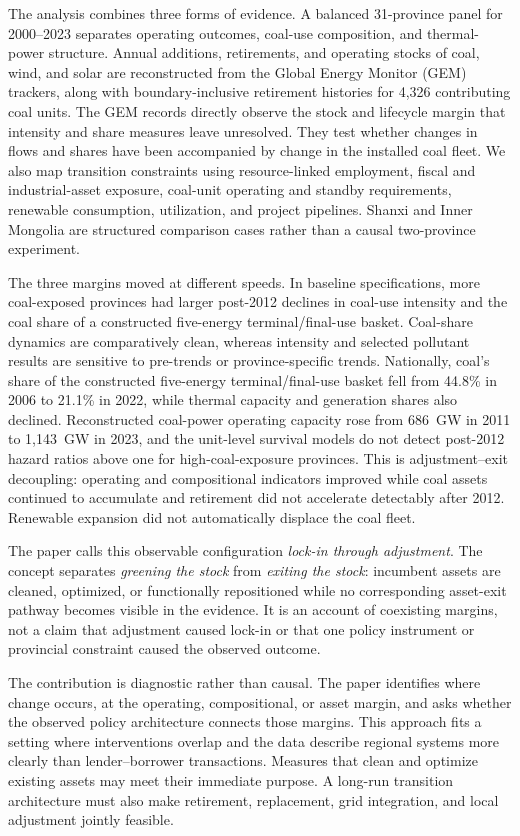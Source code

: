 \documentclass[11pt]{article}
\begin{document}
The analysis combines three forms of evidence. A balanced 31-province panel for 2000--2023 separates operating outcomes, coal-use composition, and thermal-power structure. Annual additions, retirements, and operating stocks of coal, wind, and solar are reconstructed from the Global Energy Monitor (GEM) trackers, along with boundary-inclusive retirement histories for 4,326 contributing coal units. The GEM records directly observe the stock and lifecycle margin that intensity and share measures leave unresolved. They test whether changes in flows and shares have been accompanied by change in the installed coal fleet. We also map transition constraints using resource-linked employment, fiscal and industrial-asset exposure, coal-unit operating and standby requirements, renewable consumption, utilization, and project pipelines. Shanxi and Inner Mongolia are structured comparison cases rather than a causal two-province experiment.

The three margins moved at different speeds. In baseline specifications, more coal-exposed provinces had larger post-2012 declines in coal-use intensity and the coal share of a constructed five-energy terminal/final-use basket. Coal-share dynamics are comparatively clean, whereas intensity and selected pollutant results are sensitive to pre-trends or province-specific trends. Nationally, coal's share of the constructed five-energy terminal/final-use basket fell from 44.8\% in 2006 to 21.1\% in 2022, while thermal capacity and generation shares also declined. Reconstructed coal-power operating capacity rose from 686~GW in 2011 to 1,143~GW in 2023, and the unit-level survival models do not detect post-2012 hazard ratios above one for high-coal-exposure provinces. This is adjustment--exit decoupling: operating and compositional indicators improved while coal assets continued to accumulate and retirement did not accelerate detectably after 2012. Renewable expansion did not automatically displace the coal fleet.

The paper calls this observable configuration \textit{lock-in through adjustment}. The concept separates \textit{greening the stock} from \textit{exiting the stock}: incumbent assets are cleaned, optimized, or functionally repositioned while no corresponding asset-exit pathway becomes visible in the evidence. It is an account of coexisting margins, not a claim that adjustment caused lock-in or that one policy instrument or provincial constraint caused the observed outcome.

The contribution is diagnostic rather than causal. The paper identifies where change occurs, at the operating, compositional, or asset margin, and asks whether the observed policy architecture connects those margins. This approach fits a setting where interventions overlap and the data describe regional systems more clearly than lender--borrower transactions. Measures that clean and optimize existing assets may meet their immediate purpose. A long-run transition architecture must also make retirement, replacement, grid integration, and local adjustment jointly feasible.
\end{document}
